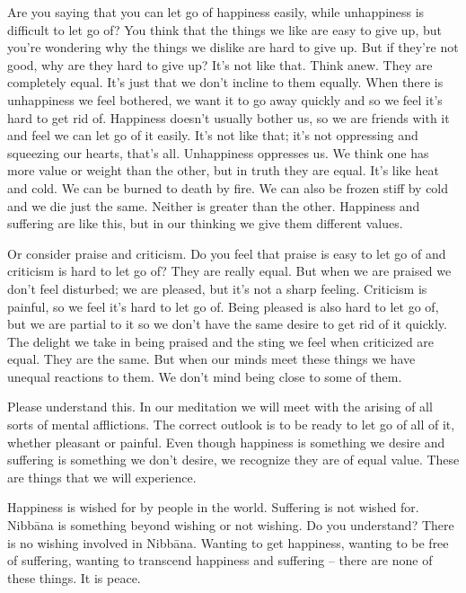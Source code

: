 Are you saying that you can let go of happiness easily, while unhappiness is difficult to let go of? You think that the things we like are easy to give up, but you're wondering why the things we dislike are hard to give up. But if they're not good, why are they hard to give up? It's not like that. Think anew. They are completely equal. It's just that we don't incline to them equally. When there is unhappiness we feel bothered, we want it to go away quickly and so we feel it's hard to get rid of. Happiness doesn't usually bother us, so we are friends with it and feel we can let go of it easily. It's not like that; it's not oppressing and squeezing our hearts, that's all. Unhappiness oppresses us. We think one has more value or weight than the other, but in truth they are equal. It's like heat and cold. We can be burned to death by fire. We can also be frozen stiff by cold and we die just the same. Neither is greater than the other. Happiness and suffering are like this, but in our thinking we give them different values.

Or consider praise and criticism. Do you feel that praise is easy to let go of and criticism is hard to let go of? They are really equal. But when we are praised we don't feel disturbed; we are pleased, but it's not a sharp feeling. Criticism is painful, so we feel it's hard to let go of. Being pleased is also hard to let go of, but we are partial to it so we don't have the same desire to get rid of it quickly. The delight we take in being praised and the sting we feel when criticized are equal. They are the same. But when our minds meet these things we have unequal reactions to them. We don't mind being close to some of them.

Please understand this. In our meditation we will meet with the arising of all sorts of mental afflictions. The correct outlook is to be ready to let go of all of it, whether pleasant or painful. Even though happiness is something we desire and suffering is something we don't desire, we recognize they are of equal value. These are things that we will experience.

Happiness is wished for by people in the world. Suffering is not wished for. Nibb\=ana is something beyond wishing or not wishing. Do you understand? There is no wishing involved in Nibb\=ana. Wanting to get happiness, wanting to be free of suffering, wanting to transcend happiness and suffering -- there are none of these things. It is peace.

